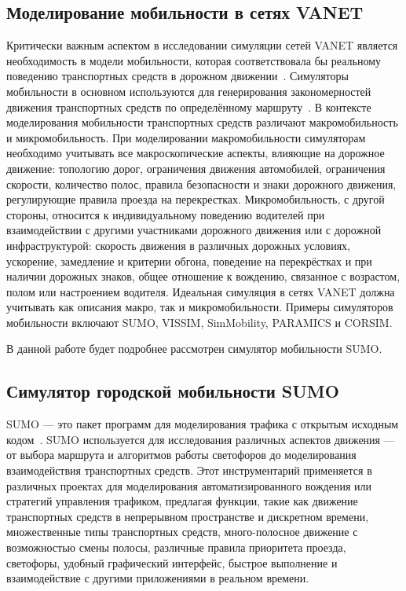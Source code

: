 \subsection{Моделирование мобильности в сетях VANET}

Критически важным аспектом в исследовании симуляции сетей VANET является необходимость в модели мобильности, которая соответствовала бы реальному поведению транспортных средств в дорожном движении~\cite{akhtar2014vehicle}. Симуляторы мобильности в основном используются для генерирования закономерностей движения транспортных средств по определённому маршруту~\cite{lan2008realistic}. В контексте моделирования мобильности транспортных средств различают макромобильность и микромобильность. При моделировании макромобильности симуляторам необходимо учитывать все макроскопические аспекты, влияющие на дорожное движение: топологию дорог, ограничения движения автомобилей, ограничения скорости, количество полос, правила безопасности и знаки дорожного движения, регулирующие правила проезда на перекрестках.
Микромобильность, с другой стороны, относится к индивидуальному поведению водителей при взаимодействии с другими участниками дорожного движения или с дорожной инфраструктурой: скорость движения в различных дорожных условиях, ускорение, замедление и критерии обгона, поведение на перекрёстках и при наличии дорожных знаков, общее отношение к вождению, связанное с возрастом, полом или настроением водителя. Идеальная симуляция в сетях VANET должна учитывать как описания макро, так и микромобильности. Примеры симуляторов мобильности включают SUMO, VISSIM, SimMobility, PARAMICS и CORSIM.

В данной работе будет подробнее рассмотрен симулятор мобильности SUMO.

\subsection{Симулятор городской мобильности SUMO}

SUMO --- это пакет программ для моделирования трафика с открытым исходным кодом~\cite{sumo_docs}. SUMO используется для исследования различных аспектов движения --- от выбора маршрута и алгоритмов работы светофоров до моделирования взаимодействия транспортных средств. Этот инструментарий применяется в различных проектах для моделирования автоматизированного вождения или стратегий управления трафиком, предлагая функции, такие как движение транспортных средств в непрерывном пространстве и дискретном времени, множественные типы транспортных средств, много-полосное движение с возможностью смены полосы, различные правила приоритета проезда, светофоры, удобный графический интерфейс, быстрое выполнение и взаимодействие с другими приложениями в реальном времени.

